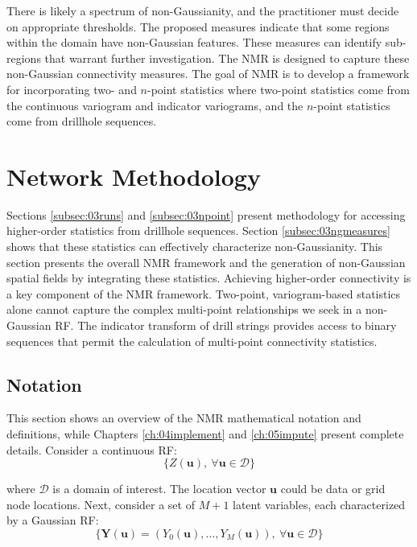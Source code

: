 There is likely a spectrum of non-Gaussianity, and the practitioner must decide on appropriate thresholds. The proposed measures indicate that some regions within the domain have non-Gaussian features. These measures can identify sub-regions that warrant further investigation. The \gls{NMR} is designed to capture these non-Gaussian connectivity measures. The goal of \gls{NMR} is to develop a framework for incorporating two- and $n$-point statistics where two-point statistics come from the continuous variogram and indicator variograms, and the $n$-point statistics come from drillhole sequences.


\FloatBarrier
\section{Network Methodology}
\label{sec:method}

Sections \ref{subsec:03runs} and \ref{subsec:03npoint} present methodology for accessing higher-order statistics from drillhole sequences. Section \ref{subsec:03ngmeasures} shows that these statistics can effectively characterize non-Gaussianity. This section presents the overall \gls{NMR} framework and the generation of non-Gaussian spatial fields by integrating these statistics. Achieving higher-order connectivity is a key component of the \gls{NMR} framework. Two-point, variogram-based statistics alone cannot capture the complex multi-point relationships we seek in a non-Gaussian \gls{RF}. The indicator transform of drill strings provides access to binary sequences that permit the calculation of multi-point connectivity statistics.


\subsection{Notation}
\label{subsec:03notation}

This section shows an overview of the \gls{NMR} mathematical notation and definitions, while Chapters \ref{ch:04implement} and \ref{ch:05impute} present complete details. Consider a continuous \gls{RF}:
\begin{equation}
    \{Z(\mathbf{u}), \ \forall \mathbf{u} \in \mathcal{D}\}
    \label{eq:zu}
\end{equation}

\lowercase{Where} $\mathcal{D}$ is a domain of interest. The location vector $\mathbf{u}$ could be data or grid node locations. Next, consider a set of $M+1$ latent variables, each characterized by a Gaussian \gls{RF}:
\begin{equation}
    \{\mathbf{Y}(\mathbf{u}) = (Y_{0}(\mathbf{u}), \dots, Y_{M}(\mathbf{u})), \ \forall \mathbf{u} \in \mathcal{D}\}
    \label{eq:gpool}
\end{equation}


